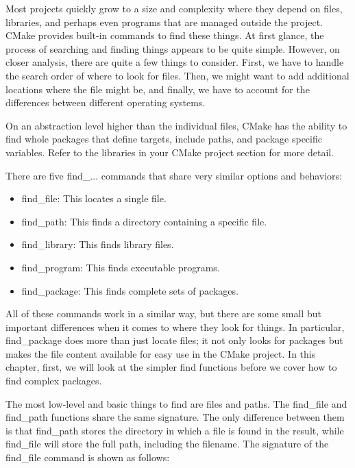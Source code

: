 
Most projects quickly grow to a size and complexity where they depend on files, libraries, and perhaps even programs that are managed outside the project. CMake provides built-in commands to find these things. At first glance, the process of searching and finding things appears to be quite simple. However, on closer analysis, there are quite a few things to consider. First, we have to handle the search order of where to look for files. Then, we might want to add additional locations where the file might be, and finally, we have to account for the differences between different operating systems.

On an abstraction level higher than the individual files, CMake has the ability to find whole packages that define targets, include paths, and package specific variables. Refer to the libraries in your CMake project section for more detail.

There are five find\_... commands that share very similar options and behaviors:

\begin{itemize}
\item 
find\_file: This locates a single file.

\item 
find\_path: This finds a directory containing a specific file.

\item 
find\_library: This finds library files.

\item 
find\_program: This finds executable programs.

\item 
find\_package: This finds complete sets of packages.
\end{itemize}

All of these commands work in a similar way, but there are some small but important differences when it comes to where they look for things. In particular, find\_package does more than just locate files; it not only looks for packages but makes the file content available for easy use in the CMake project. In this chapter, first, we will look at the simpler find functions before we cover how to find complex packages.


The most low-level and basic things to find are files and paths. The find\_file and find\_path functions share the same signature. The only difference between them is that find\_path stores the directory in which a file is found in the result, while find\_file will store the full path, including the filename. The signature of the find\_file command is shown as follows:

